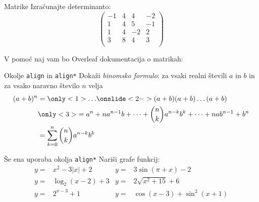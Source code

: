 \begin{frame}{Matrike}
	Izračunajte determinanto:
$$
	\begin{pmatrix}
		-1 & 4 & 4 & -2\\
		1 & 4 & 5 & -1\\
		1 & 4 & -2 & 2\\
		3 & 8 & 4 & 3\\
	\end{pmatrix}
$$	
	
	V pomoč naj vam bo Overleaf dokumentacija o matrikah:
	\href{https://www.overleaf.com/learn/latex/Matrices}{}
\end{frame}

\begin{frame}{Okolje \texttt{align} in \texttt{align*}}
	Dokaži \emph{binomsko formulo}: za vsaki realni števili $a$ in $b$ in za vsako naravno število $n$ velja
	\begin{align*}
		(a+b)^n &= \only<1>{\ldots} 
		\onslide<2->{(a+b) (a+b) \dots (a+b)}\\
		&\only<3>{= a^n + n a^{n-1} b + \dots + \binom{n}{k} a^{n-k} b^k + \dots + n a b^{n-1} + b^n}\\
		&= \sum_{k=0}^n \binom{n}{k} a^{n-k} b^k
	\end{align*}
\end{frame}

\begin{frame}{Še ena uporaba okolja \texttt{align*}}
	Nariši grafe funkcij:
	\begin{align*}
		y = &x^2 - 3|x| + 2    &y = &3 \sin(\pi+x) - 2 \\
		y = &\log_2(x-2) + 3   &y = &2 \sqrt{x^2+15} + 6 \\
		y = &2^{x-3} + 1       &y = &\cos(x-3) + \sin^2(x+1)\\
	\end{align*} 
\end{frame}

